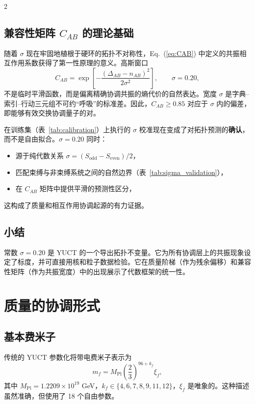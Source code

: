 \documentclass[11pt,a4paper]{article}
\begin{document}
\begin{multicols}{2}
		\subsection{兼容性矩阵 \(C_{AB}\) 的理论基础}
		
		随着 $\sigma$ 现在牢固地植根于硬环的拓扑不对称性，Eq.~(\ref{eq:CAB}) 中定义的共振相互作用系数获得了第一性原理的意义。高斯窗口
		\[
		C_{AB} = \exp\!\left[ -\frac{(\Delta_{AB} - n_{AB})^2}{2\sigma^2} \right],\qquad \sigma = 0.20,
		\]
		不是临时平滑函数，而是偏离精确协调共振的熵代价的自然表达。宽度 $\sigma$ 是字典–索引–行动三元组不可约“呼吸”的标准差。因此，$C_{AB} \ge 0.85$ 对应于 $\sigma$ 内的偏差，即能够有效交换协调量子的对。
		
		在训练集（表~\ref{tab:calibration}）上执行的 $\sigma$ 校准现在变成了对拓扑预测的\textbf{确认}，而不是自由拟合。$\sigma = 0.20$ 同时：
		\begin{itemize}
			\item 源于纯代数关系 $\sigma = (S_{\mathrm{odd}} - S_{\mathrm{even}})/2$，
			\item 匹配束缚与非束缚系统之间的自然边界（表~\ref{tab:sigma_validation}），
			\item 在 $C_{AB}$ 矩阵中提供平滑的预测性区分，
		\end{itemize}
		这构成了质量和相互作用协调起源的有力证据。
		
		\subsection{小结}
		常数 $\sigma = 0.20$ 是 YUCT 的一个导出拓扑不变量。它为所有协调层上的共振现象设定了标度，并可直接用核和粒子数据检验。它在质量阶梯（作为残余偏移）和兼容性矩阵（作为共振宽度）中的出现展示了代数框架的统一性。
		
		\section{质量的协调形式}
		\label{sec:formalism}
		
		\subsection{基本费米子}
		
		传统的 YUCT 参数化将带电费米子表示为
		\begin{equation}
			m_f = M_{\mathrm{Pl}} \left( \frac{2}{3} \right)^{96 + k_f} \xi_f,
			\label{eq:mass_fermion}
		\end{equation}
		其中 \(M_{\mathrm{Pl}} = 1.2209\times 10^{19}\) GeV，\(k_f \in \{4,6,7,8,9,11,12\}\)，\(\xi_f\) 是唯象的。这种描述虽然准确，但使用了 18 个自由参数。
		

\end{multicols}
\end{document}
